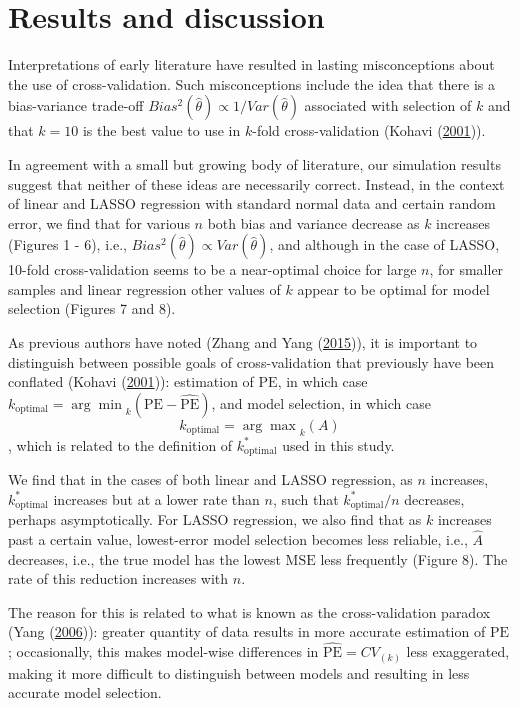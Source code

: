 \documentclass[
  12pt,
]{article}
\begin{document}
\hypertarget{results-and-discussion}{%
\section{Results and discussion}\label{results-and-discussion}}

Interpretations of early literature have resulted in lasting
misconceptions about the use of cross-validation. Such misconceptions
include the idea that there is a bias-variance trade-off
\(Bias^2(\hat{\theta}) \propto 1/Var(\hat{\theta})\) associated with
selection of \(k\) and that \(k = 10\) is the best value to use in
\(k\)-fold cross-validation (Kohavi
(\protect\hyperlink{ref-Kohavi2001}{2001})).

In agreement with a small but growing body of literature, our simulation
results suggest that neither of these ideas are necessarily correct.
Instead, in the context of linear and LASSO regression with standard
normal data and certain random error, we find that for various \(n\)
both bias and variance decrease as \(k\) increases (Figures 1 - 6),
i.e., \(Bias^2(\hat{\theta}) \propto Var(\hat{\theta})\), and although
in the case of LASSO, 10-fold cross-validation seems to be a
near-optimal choice for large \(n\), for smaller samples and linear
regression other values of \(k\) appear to be optimal for model
selection (Figures 7 and 8).

As previous authors have noted (Zhang and Yang
(\protect\hyperlink{ref-Zhang2015}{2015})), it is important to
distinguish between possible goals of cross-validation that previously
have been conflated (Kohavi (\protect\hyperlink{ref-Kohavi2001}{2001})):
estimation of \(\mathrm{PE}\), in which case
\(k_\mathrm{optimal} = {\arg\min}_{k}(\mathrm{PE} - \mathrm{\widehat{PE}})\),
and model selection, in which case
\[k_\mathrm{optimal} = {\arg\max}_k(A)\], which is related to the
definition of \(k_\mathrm{optimal}^*\) used in this study.

We find that in the cases of both linear and LASSO regression, as \(n\)
increases, \(k_\mathrm{optimal}^*\) increases but at a lower rate than
\(n\), such that \(k_\mathrm{optimal}^*/n\) decreases, perhaps
asymptotically. For LASSO regression, we also find that as \(k\)
increases past a certain value, lowest-error model selection becomes
less reliable, i.e., \(\hat{A}\) decreases, i.e., the true model has the
lowest \(\mathrm{MSE}\) less frequently (Figure 8). The rate of this
reduction increases with \(n\).

The reason for this is related to what is known as the cross-validation
paradox (Yang (\protect\hyperlink{ref-Yang2006}{2006})): greater
quantity of data results in more accurate estimation of \(\mathrm{PE}\);
occasionally, this makes model-wise differences in
\(\mathrm{\widehat{PE}} = CV_{(k)}\) less exaggerated, making it more
difficult to distinguish between models and resulting in less accurate
model selection.
\end{document}
